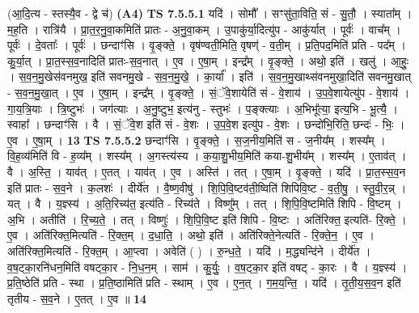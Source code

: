 \documentclass[17pt]{extarticle}
\begin{document}
                  \newline
                      (आ॒दि॒त्य - स्तस्यै॒व - द्वे च॑)  \textbf{(A4)} \newline \newline
                                \textbf{ TS 7.5.5.1} \newline
                  यदि॑ । सोमौ᳚ । सꣳसु॑ता॒विति॒ सं - सु॒तौ॒ । स्याता᳚म् । म॒ह॒ति । रात्रि॑यै । प्रा॒त॒र॒नु॒वा॒कमिति॑ प्रातः - अ॒नु॒वा॒कम् । उ॒पाकु॑र्या॒दित्यु॑प - आकु॑र्यात् । पूर्वः॑ । वाच᳚म् । पूर्वः॑ । दे॒वताः᳚ । पूर्वः॑ । छन्दाꣳ॑सि । वृ॒ङ्क्ते॒ । वृष॑ण्वती॒मिति॒ वृषण्॑ - व॒ती॒म् । प्र॒ति॒पद॒मिति॑ प्रति - पद᳚म् । कु॒र्या॒त् । प्रा॒त॒स्स॒व॒नादिति॑ प्रातः-स॒व॒नात् । ए॒व । ए॒षा॒म् । इन्द्र᳚म् । वृ॒ङ्क्ते॒ । अथो॒ इति॑ । खलु॑ । आ॒हुः॒ । स॒व॒न॒मु॒खेस॑वनमुख॒ इति॑ सवनमु॒खे - स॒व॒न॒मु॒खे॒ । का॒र्या᳚ । इति॑ । स॒व॒न॒मु॒खाथ्स॑वनमुखा॒दिति॑ सवनमु॒खात् - स॒व॒न॒मु॒खा॒त् । ए॒व । ए॒षा॒म् । इन्द्र᳚म् । वृ॒ङ्क्ते॒ । सं॒ॅवे॒शायेति॑ सं - वे॒शाय॑ । उ॒प॒वे॒शायेत्यु॑प - वे॒शाय॑ । गा॒य॒त्रि॒याः । त्रि॒ष्टुभः॑ । जग॑त्याः । अ॒नु॒ष्टुभ॒ इत्य॑नु - स्तुभः॑ । प॒ङ्क्त्याः । अ॒भिभू᳚त्या॒ इत्य॒भि - भू॒त्यै॒ । स्वाहा᳚ । छन्दाꣳ॑सि । वै । सं॒ॅवे॒श इति॑ सं - वे॒शः । उ॒प॒वे॒श इत्यु॑प - वे॒शः । छन्दो॑भि॒रिति॒ छन्दः॑ - भिः॒ । ए॒व । ए॒षा॒म् । \textbf{  13} \newline
                  \newline
                                \textbf{ TS 7.5.5.2} \newline
                  छन्दाꣳ॑सि । वृ॒ङ्क्ते॒ । स॒ज॒नीय॒मिति॑ स - ज॒नीय᳚म् । शस्य᳚म् । वि॒ह॒व्य॑मिति॑ वि - ह॒व्य᳚म् । शस्य᳚म् । अ॒गस्त्य॑स्य । क॒या॒शु॒भीय॒मिति॑ कया-शु॒भीय᳚म् । शस्य᳚म् । ए॒ताव॑त् । वै । अ॒स्ति॒ । याव॑त् । ए॒तत् । याव॑त् । ए॒व । अस्ति॑ । तत् । ए॒षा॒म् । वृ॒ङ्क्ते॒ । यदि॑ । प्रा॒त॒स्स॒व॒न इति॑ प्रातः - स॒व॒ने । क॒लशः॑ । दीर्ये॑त । वै॒ष्ण॒वीषु॑ । शि॒पि॒वि॒ष्टव॑ती॒ष्विति॑ शिपिवि॒ष्ट - व॒ती॒षु॒ । स्तु॒वी॒र॒न्न् । यत् । वै । य॒ज्ञ्स्य॑ । अ॒ति॒रिच्य॑त॒ इत्य॑ति - रिच्य॑ते । विष्णु᳚म् । तत् । शि॒पि॒वि॒ष्टमिति॑ शिपि - वि॒ष्टम् । अ॒भि । अतीति॑ । रि॒च्य॒ते॒ । तत् । विष्णुः॑ । शि॒पि॒वि॒ष्ट इति॑ शिपि - वि॒ष्टः । अति॑रिक्त॒ इत्यति॑- रि॒क्ते॒ । ए॒व । अति॑रिक्त॒मित्यति॑ - रि॒क्त॒म् । द॒धा॒ति॒ । अथो॒ इति॑ । अति॑रिक्ते॒नेत्यति॑ - रि॒क्ते॒न॒ । ए॒व । अति॑रिक्त॒मित्यति॑ - रि॒क्त॒म् । आ॒प्त्वा । अवेति॑ ( ) । रु॒न्ध॒ते॒ । यदि॑ । म॒द्ध्यन्दि॑ने । दीर्ये॑त । व॒ष॒ट्का॒रनि॑धन॒मिति॑ वषट्का॒र - नि॒ध॒न॒म् । साम॑ । कु॒र्युः॒ । व॒ष॒ट्का॒र इति॑ वषट् - का॒रः । वै । य॒ज्ञ्स्य॑ । प्र॒ति॒ष्ठेति॑ प्रति - स्था । प्र॒ति॒ष्ठामिति॑ प्रति - स्थाम् । ए॒व । ए॒न॒त् । ग॒म॒य॒न्ति॒ । यदि॑ । तृ॒ती॒य॒स॒व॒न इति॑ तृतीय - स॒व॒ने । ए॒तत् । ए॒व ॥ \textbf{  14} \newline
\end{document}

